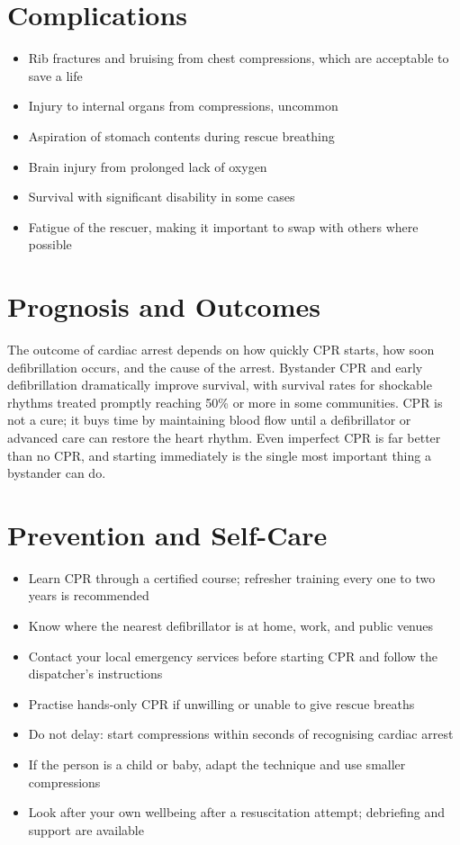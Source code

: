 \section*{Complications}
\begin{itemize}
    \item Rib fractures and bruising from chest compressions, which are acceptable to save a life
    \item Injury to internal organs from compressions, uncommon
    \item Aspiration of stomach contents during rescue breathing
    \item Brain injury from prolonged lack of oxygen
    \item Survival with significant disability in some cases
    \item Fatigue of the rescuer, making it important to swap with others where possible
\end{itemize}

\section*{Prognosis and Outcomes}
The outcome of cardiac arrest depends on how quickly CPR starts, how soon defibrillation occurs, and the cause of the arrest. Bystander CPR and early defibrillation dramatically improve survival, with survival rates for shockable rhythms treated promptly reaching 50\% or more in some communities. CPR is not a cure; it buys time by maintaining blood flow until a defibrillator or advanced care can restore the heart rhythm. Even imperfect CPR is far better than no CPR, and starting immediately is the single most important thing a bystander can do.

\section*{Prevention and Self-Care}
\begin{itemize}
    \item Learn CPR through a certified course; refresher training every one to two years is recommended
    \item Know where the nearest defibrillator is at home, work, and public venues
    \item Contact your local emergency services before starting CPR and follow the dispatcher's instructions
    \item Practise hands-only CPR if unwilling or unable to give rescue breaths
    \item Do not delay: start compressions within seconds of recognising cardiac arrest
    \item If the person is a child or baby, adapt the technique and use smaller compressions
    \item Look after your own wellbeing after a resuscitation attempt; debriefing and support are available
\end{itemize}

